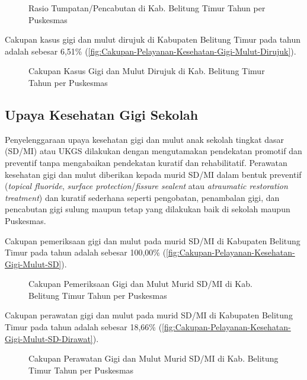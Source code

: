 \begin{figure}[H]
	\centering
	\caption{Rasio Tumpatan/Pencabutan di Kab. Belitung Timur Tahun \tP per Puskesmas}
	\label{fig:Cakupan-Pelayanan-Kesehatan-Gigi-Mulut-Tumpatan}
\end{figure}

Cakupan kasus gigi dan mulut dirujuk di Kabupaten Belitung Timur pada tahun \tP adalah sebesar 6,51\% (\autoref{fig:Cakupan-Pelayanan-Kesehatan-Gigi-Mulut-Dirujuk}).

\begin{figure}[H]
	\centering
	\caption{Cakupan Kasus Gigi dan Mulut Dirujuk di Kab. Belitung Timur Tahun \tP per Puskesmas}
	\label{fig:Cakupan-Pelayanan-Kesehatan-Gigi-Mulut-Dirujuk}
\end{figure}

\subsection{Upaya Kesehatan Gigi Sekolah}
Penyelenggaraan upaya kesehatan gigi dan mulut anak sekolah tingkat dasar (SD/MI) atau UKGS dilakukan dengan mengutamakan pendekatan promotif dan preventif tanpa mengabaikan pendekatan kuratif dan rehabilitatif.
Perawatan kesehatan gigi dan mulut diberikan kepada murid SD/MI dalam bentuk preventif (\textit{topical fluoride}, \textit{surface protection}/\textit{fissure sealent} atau \textit{atraumatic restoration treatment}) dan kuratif sederhana seperti pengobatan, penambalan gigi, dan pencabutan gigi sulung maupun tetap yang dilakukan baik di sekolah maupun Puskesmas.

Cakupan pemeriksaan gigi dan mulut pada murid SD/MI di Kabupaten Belitung Timur pada tahun \tP adalah sebesar 100,00\% (\autoref{fig:Cakupan-Pelayanan-Kesehatan-Gigi-Mulut-SD}).

\begin{figure}[H]
	\centering
	\caption{Cakupan Pemeriksaan Gigi dan Mulut Murid SD/MI di Kab. Belitung Timur Tahun \tP per Puskesmas}
	\label{fig:Cakupan-Pelayanan-Kesehatan-Gigi-Mulut-SD}
\end{figure}

Cakupan perawatan gigi dan mulut pada murid SD/MI di Kabupaten Belitung Timur pada tahun \tP adalah sebesar 18,66\% (\autoref{fig:Cakupan-Pelayanan-Kesehatan-Gigi-Mulut-SD-Dirawat}).

\begin{figure}[H]
	\centering
	\caption{Cakupan Perawatan Gigi dan Mulut Murid SD/MI di Kab. Belitung Timur Tahun \tP per Puskesmas}
	\label{fig:Cakupan-Pelayanan-Kesehatan-Gigi-Mulut-SD-Dirawat}
\end{figure}

